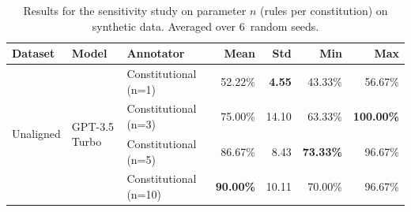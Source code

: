 \begin{table}[H]
\centering
\caption{Results for the sensitivity study on parameter $n$ (rules per constitution) on synthetic data. Averaged over 6~random seeds.}
\label{tab:synthetic_param_n_num_results}
\begin{tabularx}{\textwidth}{lllrrrr}
\toprule
\textbf{Dataset} & \textbf{Model} & \textbf{Annotator} & \textbf{Mean} & \textbf{Std} & \textbf{Min} & \textbf{Max} \\
\midrule
\multirow[t]{4}{*}{Unaligned} & \multirow[t]{4}{*}{GPT-3.5 Turbo} & Constitutional (n=1) & 52.22\% & \textbf{4.55} & 43.33\% & 56.67\% \\
 &  & Constitutional (n=3) & 75.00\% & 14.10 & 63.33\% & \textbf{100.00\%} \\
 &  & Constitutional (n=5) & 86.67\% & 8.43 & \textbf{73.33\%} & 96.67\% \\
 &  & Constitutional (n=10) & \textbf{90.00\%} & 10.11 & 70.00\% & 96.67\% \\
\bottomrule
\end{tabularx}
\end{table}
